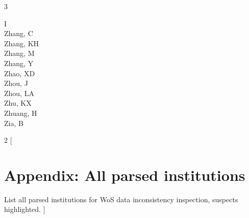 \documentclass[a4paper]{article}
\begin{document}
\begin{multicols*}{3}
\begin{footnotesize}
 I \\ Zhang, C \\ Zhang, KH \\ Zhang, M \\ Zhang, Y \\ Zhao, XD \\ Zhou, J \\ Zhou, LA \\ Zhu, KX \\ Zhuang, H \\ Zia, B
\end{footnotesize}
\end{multicols*}

\clearpage

\begin{multicols*}{2}
[
\section{Appendix: All parsed institutions}
List all parsed institutions for WoS data inconsistency inspection, suspects highlighted.
]
\begin{footnotesize}

\end{footnotesize}
\end{multicols*}
\end{document}
